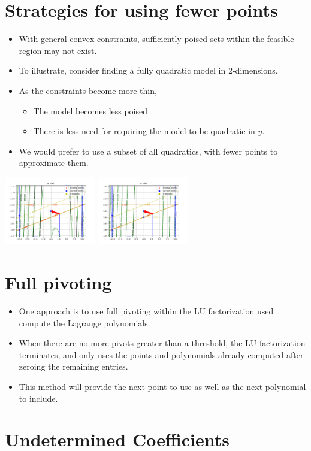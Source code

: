 

\section{Strategies for using fewer points}

    \begin{itemize}
        \item With general convex constraints, sufficiently poised sets within the feasible region may not exist.
        \item To illustrate, consider finding a fully quadratic model in 2-dimensions.
        \item As the constraints become more thin,
            \begin{itemize}
                \item The model becomes less poised
                \item There is less need for requiring the model to be quadratic in $y$.
            \end{itemize}
        \item We would prefer to use a subset of all quadratics, with fewer points to approximate them.
    \end{itemize}

\includegraphics[width=150px]{images/2_2_4_68.png}
\includegraphics[width=150px]{images/2_3_5_1.png}


\section{Full pivoting}
\begin{itemize}
    \item One approach is to use full pivoting within the LU factorization used compute the Lagrange polynomials.

    \item When there are no more pivots greater than a threshold, the LU factorization terminates, and only uses the points and polynomials already computed after zeroing the remaining entries.
        
    \item This method will provide the next point to use as well as the next polynomial to include.
        
\end{itemize}

\section{Undetermined Coefficients}

